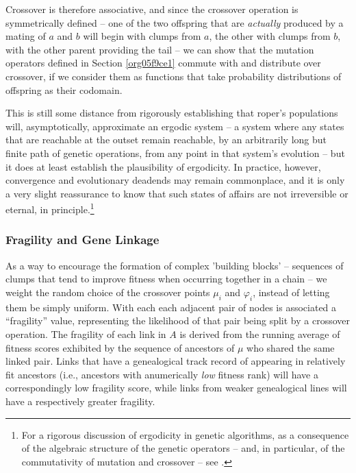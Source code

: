 \documentclass[12pt,glossary]{dalthesis}
\begin{document}
Crossover is therefore associative, and since the crossover operation is symmetrically
defined -- one of the two offspring that are \emph{actually} produced by a mating of \(a\) 
and \(b\) will begin with clumps from \(a\), the other with clumps from \(b\), with the other
parent providing the tail -- we can show that the mutation operators defined in
Section \ref{org05f9ce1} commute with and distribute over crossover, if we consider
them as functions that take probability distributions of offspring as their codomain. 

This is still some distance from rigorously establishing that \gls{roper}'s populations
will, asymptotically, approximate an ergodic system -- a system where any states that
are reachable at the outset remain reachable, by an arbitrarily long but
finite path of genetic operations, from any point in that system's evolution -- but
it does at least establish the plausibility of ergodicity. In practice, however,
convergence and evolutionary deadends may remain commonplace, and it is only a very
slight reassurance to know that such states of affairs are not irreversible or 
eternal, in principle.\footnote{For a rigorous discussion of ergodicity in genetic algorithms, as a consequence of the algebraic structure of the genetic operators -- and, in particular, of the commutativity of mutation and crossover -- see \cite{schmitt01}.}


\subsubsection{Fragility and Gene Linkage}
\label{sec:orgcc3eccd}
\label{org91a9ae1}

As a way to encourage the formation of complex 'building blocks' -- sequences of
clumps that tend to improve fitness when occurring together in a chain -- we
weight the random choice of the crossover points \(\mu_i\) and \(\varphi_i\),
instead of letting them be simply uniform. With each each adjacent pair of nodes
is associated a ``fragility'' value, representing the likelihood of that
pair being split by a crossover operation. The fragility of each link in \(A\) is
derived from the running average of fitness scores exhibited by the sequence of
ancestors of \(\mu\) who shared the same linked pair. Links that have a genealogical
track record of appearing in relatively fit ancestors (i.e., ancestors with anumerically 
\emph{low} fitness rank) will have a correspondingly low fragility score, while links
from weaker genealogical lines will have a respectively greater fragility.
\end{document}

